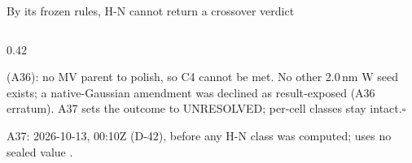 \begin{frame}{By its frozen rules, H-N cannot return a crossover verdict}
\begin{columns}[T,onlytextwidth]
\begin{column}{0.42\textwidth}
{        (A36): no MV parent to polish, so C4 cannot be met. No other 2.0\,nm W seed exists; a native-Gaussian
        amendment was declined as result-exposed (A36 erratum). A37 sets the outcome to
        UNRESOLVED; per-cell classes stay intact.\hfill$\square$\par}
      \vspace{1.0mm}
      {\scriptsize\color{inkgrey} A37: 2026-10-13, 00:10Z (D-42), before any H-N class was computed; uses no
        sealed value .\par}
    \end{column}
  \end{columns}
\end{frame}

